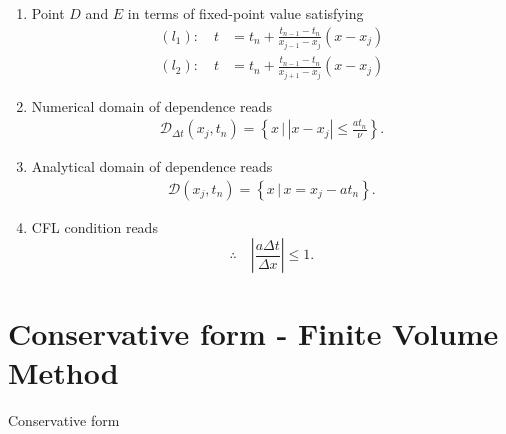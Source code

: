 \documentclass[12pt]{article}
\begin{document}
\begin{enumerate}
	\item Point $D$ and $E$ in terms of fixed-point value satisfying
	      \begin{align}
		      (l_1):\quad t & = t_n + \frac{t_{n-1}-t_n}{x_{j-1}-x_j}\left(x-x_{j}\right) \\
		      (l_2):\quad t & = t_n + \frac{t_{n-1}-t_n}{x_{j+1}-x_j}\left(x-x_{j}\right)
	      \end{align}
	\item Numerical domain of dependence reads
	      \begin{align}
		      \mathcal{D}_{\Delta t}\left(x_j,t_n\right)
		      =  \left\{ x \, \Big|\, \left| x - x_j \right| \leq \frac{at_n}{\nu} \right\}.
	      \end{align}
	      
	\item Analytical domain of dependence reads
	      \begin{align}
		      \mathcal{D}\left(x_j,t_n\right)
		      =  \left\{ x \, \Big|\, x = x_{j} - at_n \right\} .
	      \end{align}
	      
	\item CFL condition reads
	      \begin{equation}
		      \therefore\quad
		      \boxed{
			      \left| \frac{a \Delta t}{\Delta x} \right| \leq 1.
		      }
	      \end{equation}
\end{enumerate}


\pagebreak
\section{Conservative form -  Finite Volume Method}
\begin{example}
	Conservative form 
\end{example}
\end{document}
